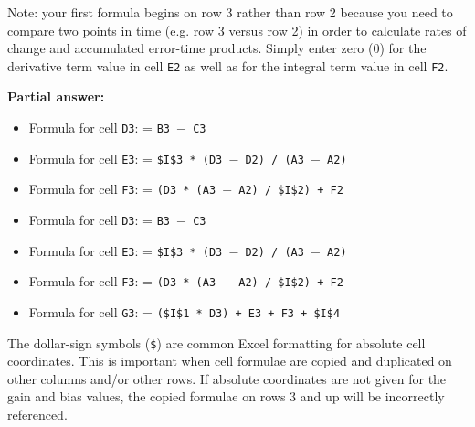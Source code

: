 Note: your first formula begins on row 3 rather than row 2 because you need to compare two points in time (e.g. row 3 versus row 2) in order to calculate rates of change and accumulated error-time products.  Simply enter zero (0) for the derivative term value in cell {\tt E2} as well as for the integral term value in cell {\tt F2}.







\noindent
{\bf Partial answer:}

\begin{itemize}
\item{} Formula for cell {\tt D3}: = {\tt B3 $-$ C3}
\vskip 10pt
\item{} Formula for cell {\tt E3}: = {\tt \$I\$3 * (D3 $-$ D2) / (A3 $-$ A2)}
\vskip 10pt
\item{} Formula for cell {\tt F3}: = {\tt (D3 * (A3 $-$ A2) / \$I\$2) + F2}
\end{itemize}







\begin{itemize}
\item{} Formula for cell {\tt D3}: = {\tt B3 $-$ C3}
\vskip 10pt
\item{} Formula for cell {\tt E3}: = {\tt \$I\$3 * (D3 $-$ D2) / (A3 $-$ A2)}
\vskip 10pt
\item{} Formula for cell {\tt F3}: = {\tt (D3 * (A3 $-$ A2) / \$I\$2) + F2}
\vskip 10pt
\item{} Formula for cell {\tt G3}: = {\tt (\$I\$1 * D3) + E3 + F3 + \$I\$4}
\end{itemize}

The dollar-sign symbols ({\tt \$}) are common Excel formatting for absolute cell coordinates.  This is important when cell formulae are copied and duplicated on other columns and/or other rows.  If absolute coordinates are not given for the gain and bias values, the copied formulae on rows 3 and up will be incorrectly referenced.






